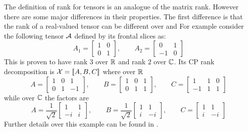The definition of rank for tensors is an analogue of the matrix rank. However there are some major differences in their properties.
The first difference is that the rank of a real-valued tensor can be different over \RR and \CC
For example consider the following tensor $\mathcal{A}$ defined by its frontal slices as:
\begin{equation*}
  A_1 = 
  \begin{bmatrix}
    1 & 0\\
    0 & 1
  \end{bmatrix}
  ,\qquad
  A_2 = 
  \begin{bmatrix}
    0 & 1\\
    -1 & 0
  \end{bmatrix}
\end{equation*}
This is proven to have rank $3$ over $\mathbb{R}$ and rank $2$ over $\mathbb{C}$. Its CP rank decomposition is $\mathcal{X} = \llbracket A, B, C \rrbracket$ where over $\mathbb{R}$
\begin{equation*}
  A = 
  \begin{bmatrix}
    1 & 0 & 1\\
    0 & 1 & -1
  \end{bmatrix}
  ,\qquad
  B = 
  \begin{bmatrix}
    1 & 0 & 1\\
    0 & 1 & 1
  \end{bmatrix}
  ,\qquad
  C = 
  \begin{bmatrix}
    1 & 1 & 0\\
    -1 & 1 & 1
  \end{bmatrix}
\end{equation*}
while over $\mathbb{C}$ the factors are
\begin{equation*}
  A = \frac{1}{\sqrt{2}}
  \begin{bmatrix}
    1 & 1\\
    -i & i
  \end{bmatrix}
  ,\qquad
  B = \frac{1}{\sqrt{2}}
  \begin{bmatrix}
    1 & 1\\
    i & -i
  \end{bmatrix}
  ,\qquad
  C = 
  \begin{bmatrix}
    1 & 1\\
    i & -i
  \end{bmatrix}
\end{equation*}
Further details over this example can be found in \cite{tensorreview}.

